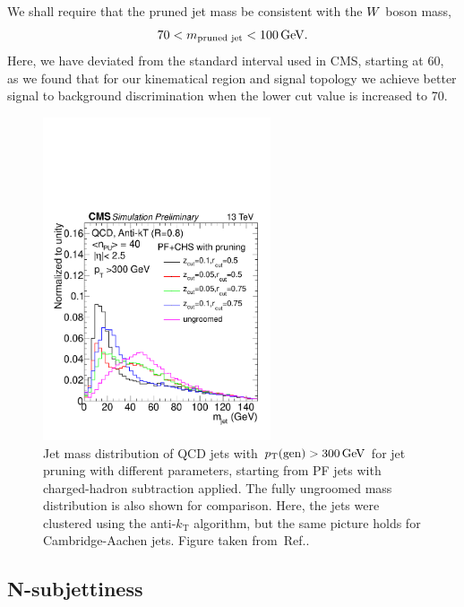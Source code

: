 We shall require that the pruned jet mass be consistent with the $W$ boson mass,
\begin{equation}
  70 < m_{\textrm{pruned jet}} < 100 \,\text{Ge\hspace{-.08em}V} .
\end{equation}
Here, we have deviated from the standard interval used in CMS, starting at 60\GeV, as we found that
for our
kinematical region and signal topology we achieve better signal to background discrimination when
the lower cut value is increased to 70\GeV. 

\begin{figure}
  \centering
  \includegraphics[width=0.6\textwidth]{figures/razor_wtag/1DPFCHS_PR_QCD}
  \caption{Jet mass distribution of QCD jets with $p_{\mathrm{T}}(\textrm{gen}) > 300 \,\text{Ge\hspace{-.08em}V}$ for jet pruning
with different parameters, starting from PF jets with charged-hadron subtraction applied. The fully
ungroomed mass distribution is also shown for comparison. Here, the jets were clustered using the
anti-$k_\mathrm{T}$ algorithm, but the same picture holds for Cambridge-Aachen jets.
Figure taken from~Ref.\cite{CMS-PAS-JME-14-001}. 
  \label{fig:wtag_jet_pruning}}
\end{figure}


\subsection{N-subjettiness}

